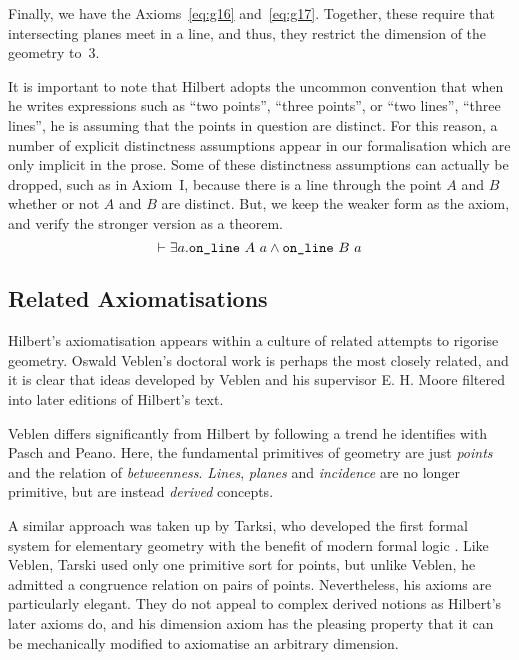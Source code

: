 Finally, we have the Axioms~\ref{eq:g16} and~\ref{eq:g17}. Together, these require that intersecting planes meet in a line, and thus, they restrict the dimension of the geometry to~3.

It is important to note that Hilbert adopts the uncommon convention that when he writes expressions such as ``two points'', ``three points'', or ``two lines'', ``three lines'', he is assuming that the points in question are distinct\label{sec:DistinctVars}. For this reason, a number of explicit distinctness assumptions appear in our formalisation which are only implicit in the prose. Some of these distinctness assumptions can actually be dropped, such as in Axiom~I, because there is a line through the point $A$ and $B$ whether or not $A$ and $B$ are distinct. But, we keep the weaker form as the axiom, and verify the stronger version as a theorem.
\begin{displaymath}
  \vdash \exists a. \code{on\_line}\ A\ a \wedge \code{on\_line}\ B\ a
\end{displaymath}

\subsection{Related Axiomatisations}
Hilbert's axiomatisation appears within a culture of related attempts to rigorise geometry. Oswald Veblen's doctoral work \cite{Veblenphd} is perhaps the most closely related, and it is clear that ideas developed by Veblen and his supervisor E. H. Moore filtered into later editions of Hilbert's text.

Veblen differs significantly from Hilbert by following a trend he identifies with Pasch and Peano. Here, the fundamental primitives of geometry are just \emph{points} and the relation of \emph{betweenness}. \emph{Lines}, \emph{planes} and \emph{incidence} are no longer primitive, but are instead \emph{derived} concepts. 

A similar approach was taken up by Tarksi, who developed the first formal system for elementary geometry with the benefit of modern formal logic \cite{TarskiGeometrySystem}. Like Veblen, Tarski used only one primitive sort for points, but unlike Veblen, he admitted a congruence relation on pairs of points. Nevertheless, his axioms are particularly elegant. They do not appeal to complex derived notions as Hilbert's later axioms do, and his dimension axiom has the pleasing property that it can be mechanically modified to axiomatise an arbitrary dimension.

